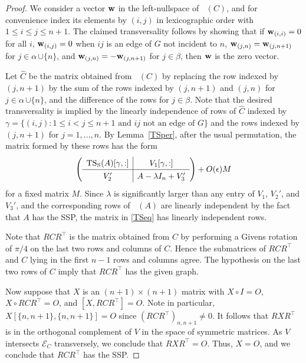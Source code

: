\documentclass[11pt]{article}
\def\red{\color{red}}
\theoremstyle{definition}
\theoremstyle{definition}
\theoremstyle{definition}
\DeclareMathOperator{\TS}{TS_S}
\DeclareMathOperator{\TSS}{TS_S}
\newcommand{\bw}{{\bf w}}
\newcommand{\beq}{\begin{equation}}
\newcommand{\eeq}{\end{equation}}
\newcommand{\mei}{\mathcal{E}} %
\def\trans{^{\top}}
\begin{document}
\begin{proof}  We consider a vector $\bw$ in the left-nullspace of $\TS(C)$, and for convenience 
index its elements by $(i,j)$ in lexicographic order with $1\leq i \leq j \leq n+1$. 
 The claimed transversality follows by showing that  
 if $\bw_{(i,i)}=0$  for all $i$,  $\bw_{(i,j)}=0$ when $ij$ is an edge of $G$ not incident to $n$, 
 $\bw_{(j,n)} =\bw_{(j,n+1)}$ for $j\in \alpha\,{\cup \{n\}}$, and $\bw_{(j,n)} =-\bw_{(j,n+1)}$ for  $j\in \beta$, then $\bw$ is the zero vector.
 
 Let $\widehat{C}$ be the matrix obtained from $\TSS(C)$ by replacing the row indexed by 
 $(j,n+1)$ by the sum of the rows indexed by $(j,n+1)$ and $(j,n)$ for $j\in \alpha\,{\cup \{n\}}$,
 and the difference of the rows for $j\in \beta$.  %
 Note that the desired  transversality is implied by the linearly independence of rows of $\widehat{C}$ 
 indexed by $\gamma=\{ (i,j) : 1\leq i< j\leq n+1\mbox{  and } ij \mbox{ not an edge of }G\}$ and the rows indexed by {$(j,n+1)$ for $j=1, \ldots , n$}.
By Lemma~\ref{TSper}, after the usual permutation, the matrix formed by these rows has the form %
\beq \left(\renewcommand{\arraystretch}{1.3} \begin{array}{c|c}
\TS(A)[\gamma,:] & V_1[\gamma,:]  \\ \hline
{V_2'}& {A-\lambda I_n+ V_3'} \end{array} 
\right) + O(\epsilon)M
\label{TSeq}
\eeq
for  a fixed matrix $M$. %
Since $\lambda$ is significantly larger than any entry of $V_1$, $V_2'$, and $V_3'$, and 
the corresponding rows of $\TS(A)$ are linearly independent by the fact that $A$ has the SSP, the matrix in \eqref{TSeq} has  linearly independent rows.

Note that $RCR\trans$ is the matrix obtained from $C$ by performing a Givens rotation of $\pi/4$ 
on the last two rows and columns of $C$.  Hence the submatrices of $RCR\trans$ and $C$ lying in the first $n-1$ rows and columns agree.
The hypothesis on the last two rows of $C$ imply that $RCR\trans$ has the given graph.

Now suppose that $X$ is an $(n+1) \times (n+1)$ matrix 
with $X\circ I=O$,  $X\circ RCR\trans=O$, and $[X,RCR\trans]=O$. Note in particular, $X[ \{n,n+1\}, \{n, n+1\}]=O$ since $(RCR\trans)_{n,n+1}\ne 0$.
It follows that $RXR\trans $ is in the  orthogonal complement of ${V}$ in the space of symmetric matrices.  As ${V}$ intersects $\mei_C$ transversely, we conclude that $RXR\trans=O$.  Thus, $X=O$, and we conclude  that $RCR\trans$ has the SSP.
\end{proof}
\end{document}
